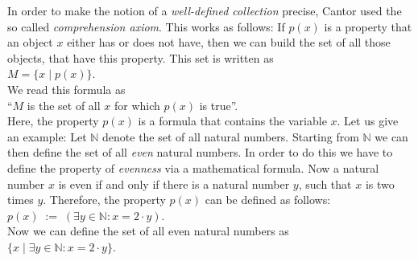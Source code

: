 In order to make the notion of a  \emph{well-defined collection} precise,
Cantor used the so called  \emph{comprehension axiom}.
This works as follows: If  $p(x)$ is a property that an object $x$ either has or does not
have, then we can build the set of all those objects, that have this property.   This set
is written as 
\\[0.2cm]
\hspace*{1.3cm} $M = \bigl\{ x \;|\; p(x) \bigr\}$. 
\\[0.2cm]
We read this formula as
\\[0.2cm]
\hspace*{1.3cm}
 ``$M$ is the set of all $x$ for which $p(x)$ is true''.
\\[0.2cm]
Here, the property $p(x)$ is a formula that contains the variable $x$.
Let us give an example:
Let $\mathbb{N}$ denote the set of all natural numbers.  Starting from $\mathbb{N}$ 
we can then define the set of all \emph{even} natural numbers.  In order to do this
we have to define the property of \emph{evenness} via a mathematical formula.
Now a natural number $x$ is even if and only if there is a natural number $y$, such that $x$
is two times $y$.
Therefore, the property $p(x)$ can be defined as follows: \\[0.2cm]
\hspace*{1.3cm} $p(x) \;:=\; (\exists y\in \mathbb{N}: x = 2 \cdot y)$. \\[0.2cm]
Now we can define the set of all even natural numbers as \\[0.2cm]
\hspace*{1.3cm} $\{ x \;|\; \exists y\in \mathbb{N}: x = 2 \cdot y \}$. 
\vspace{0.2cm}

